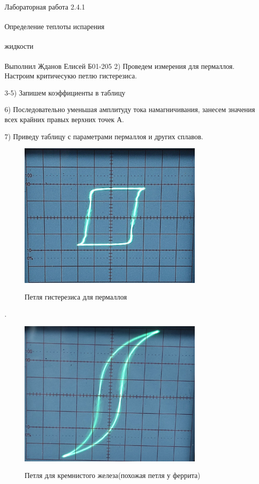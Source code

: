 \documentclass{astroedu-lab}
\begin{document}
\begin{problem}{\huge Лабораторная работа 2.4.1\\\\Определение теплоты испарения\\\\жидкости\\\\Выполнил Жданов Елисей Б01-205}
2) Проведем измерения для пермаллоя. Настроим критичесукю петлю гистерезиса.

3-5) Запишем коэффициенты в таблицу

6) Последовательно уменьшая амплитуду тока намагничивания, занесем значения всех крайних правых верхних точек А.

7) Приведу таблицу с параметрами пермаллоя и других сплавов.

\newpage

\begin{figure}[!h]
	\centering
	\caption{Петля гистерезиса для пермаллоя}
	\includegraphics[width=0.8\textwidth]{loop1.jpg}
	\label{fig:boiler}
\end{figure}

.

\begin{figure}[!h]
	\centering
	\caption{Петля для кремнистого железа(похожая петля у феррита)}
	\includegraphics[width=0.8\textwidth]{loop2.jpg}
	\label{fig:boiler}
\end{figure}


\end{problem}
\end{document}
